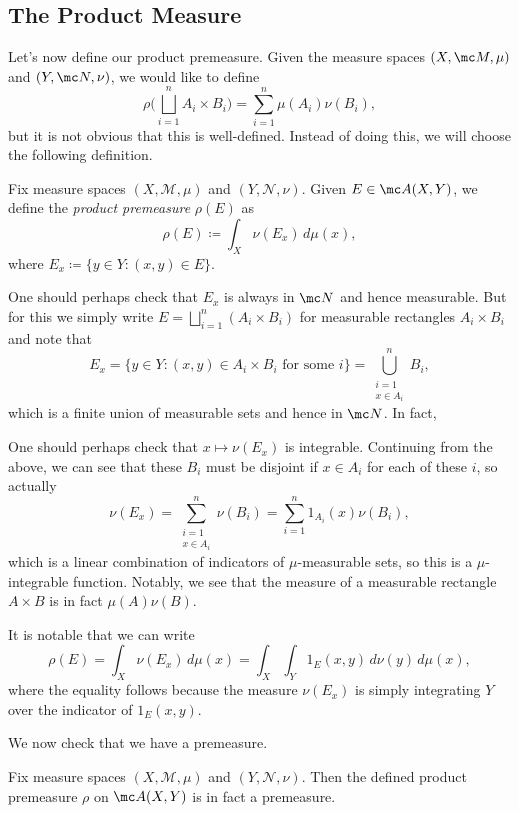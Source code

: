 \documentclass[../notes.tex]{subfiles}
\begin{document}
\subsection{The Product Measure}
Let's now define our product premeasure. Given the measure spaces $(X,\mc M,\mu)$ and $(Y,\mc N,\nu)$, we would like to define
\[\rho\Bigg(\bigsqcup_{i=1}^nA_i\times B_i\Bigg)=\sum_{i=1}^n\mu(A_i)\nu(B_i),\]
but it is not obvious that this is well-defined. Instead of doing this, we will choose the following definition.
\begin{definition} \label{def:product-premeas}
	Fix measure spaces $(X,\mathcal M,\mu)$ and $(Y,\mathcal N,\nu)$. Given $E\in\mc A(X,Y)$, we define the \textit{product premeasure} $\rho(E)$ as
	\[\rho(E)\coloneqq\int_X\nu(E_x)\,d\mu(x),\]
	where $E_x\coloneqq\{y\in Y:(x,y)\in E\}$.
\end{definition}
\begin{remark}
	One should perhaps check that $E_x$ is always in $\mc N$ and hence measurable. But for this we simply write $E=\bigsqcup_{i=1}^n(A_i\times B_i)$ for measurable rectangles $A_i\times B_i$ and note that
	\[E_x=\{y\in Y:(x,y)\in A_i\times B_i\text{ for some }i\}=\bigcup_{\substack{i=1\\x\in A_i}}^nB_i,\]
	which is a finite union of measurable sets and hence in $\mc N$. In fact, 
\end{remark}
\begin{remark}
	One should perhaps check that $x\mapsto\nu(E_x)$ is integrable. Continuing from the above, we can see that these $B_i$ must be disjoint if $x\in A_i$ for each of these $i$, so actually
	\[\nu(E_x)=\sum_{\substack{i=1\\x\in A_i}}^n\nu(B_i)=\sum_{i=1}^n1_{A_i}(x)\nu(B_i),\]
	which is a linear combination of indicators of $\mu$-measurable sets, so this is a $\mu$-integrable function. Notably, we see that the measure of a measurable rectangle $A\times B$ is in fact $\mu(A)\nu(B)$.
\end{remark}
\begin{remark} \label{rem:double-int-premeasure}
	It is notable that we can write
	\[\rho(E)=\int_X\nu(E_x)\,d\mu(x)=\int_X\int_Y1_{E}(x,y)\,d\nu(y)\,d\mu(x),\]
	where the equality follows because the measure $\nu(E_x)$ is simply integrating $Y$ over the indicator of $1_E(x,y)$.
\end{remark}
We now check that we have a premeasure.
\begin{proposition}
	Fix measure spaces $(X,\mathcal M,\mu)$ and $(Y,\mathcal N,\nu)$. Then the defined product premeasure $\rho$ on $\mc A(X,Y)$ is in fact a premeasure.
\end{proposition}
\end{document}
